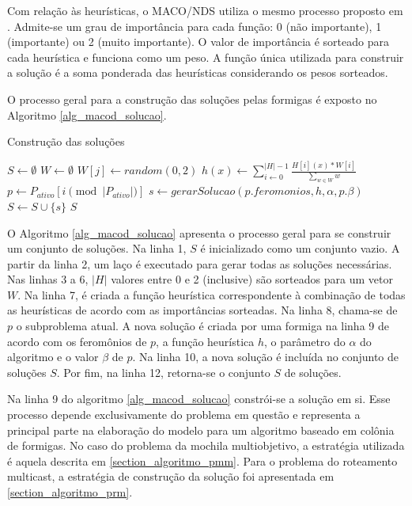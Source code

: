 Com relação às heurísticas, o MACO/NDS utiliza o mesmo processo proposto em \cite{Riveros2016}. Admite-se um grau de importância para cada função: 0 (não importante), 1 (importante) ou 2 (muito importante). O valor de importância é sorteado para cada heurística e funciona como um peso. A função única utilizada para construir a solução é a soma ponderada das heurísticas considerando os pesos sorteados.

O processo geral para a construção das soluções pelas formigas é exposto no Algoritmo \ref{alg_macod_solucao}.

\begin{algorithm}
	\caption{Construção das soluções}
	\label{alg_macod_solucao}
	\begin{algorithmic}[1]
		\State $S \gets \emptyset$
		\State $W \gets \emptyset$
		\State $W[j] \gets random(0,2)$
		\EndFor
		\State $h(x) \gets \sum_{i \gets 0}^{|H|-1}\frac{H[i](x) * W[i]}{\sum\limits_{w \in W}w}$
		\State $p \gets P_{ativo}[i \pmod{|P_{ativo}|}]$
		\State $s \gets gerarSolucao(p.feromonios, h, \alpha, p.\beta)$
		\State $S \gets S \cup \{s\}$
		\EndFor
		\State \Return $S$
	\end{algorithmic}
\end{algorithm}

O Algoritmo \ref{alg_macod_solucao} apresenta o processo geral para se construir um conjunto de soluções. Na linha 1, $S$ é inicializado como um conjunto vazio. A partir da linha 2, um laço é executado para gerar todas as soluções necessárias. Nas linhas 3 a 6, $|H|$ valores entre 0 e 2 (inclusive) são sorteados para um vetor $W$. Na linha 7, é criada a função heurística correspondente à combinação de todas as heurísticas de acordo com as importâncias sorteadas. Na linha 8, chama-se de $p$ o subproblema atual. A nova solução é criada por uma formiga na linha 9 de acordo com os feromônios de $p$, a função heurística $h$, o parâmetro do $\alpha$ do algoritmo e o valor $\beta$ de $p$. Na linha 10, a nova solução é incluída no conjunto de soluções $S$. Por fim, na linha 12, retorna-se o conjunto $S$ de soluções.

Na linha 9 do algoritmo \ref{alg_macod_solucao} constrói-se a solução em si. Esse processo depende exclusivamente do problema em questão e representa a principal parte na elaboração do modelo para um algoritmo baseado em colônia de formigas. No caso do problema da mochila multiobjetivo, a estratégia utilizada é aquela descrita em \ref{section_algoritmo_pmm}. Para o problema do roteamento multicast, a estratégia de construção da solução foi apresentada em \ref{section_algoritmo_prm}.

